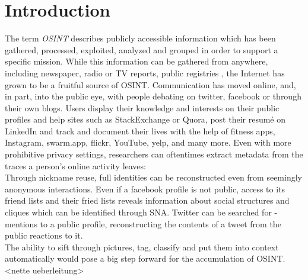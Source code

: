 \documentclass[twoside,a4paper]{article}
\title{\papertitle}
\affiliation{
\paperauthorA}
{\href{http://www.haw-hamburg.de/ti-i}{Hamburg University of Applied Sciences,
    Dept. Computer Science,} \\ Berliner Tor 7\\ 20099 Hamburg, Germany\\
{\ttfamily \href{mailto:lotte.steenbrink@haw-hamburg.de}{lotte.steenbrink@haw-hamburg.de}}
}
\newif\ifpdf
\begin{document}
\ifpdf %
  \DeclareGraphicsExtensions{.png,.jpg,.pdf}
\else  %
\fi

\maketitle

\begin{abstract}
Recognizing an categorizing objects in an image is one of the problems which are harder to solve for computers than for humans. However, image recognition is imperative to make human-computer interaction more natural and improve the way information contained in images is stored and handled. In recent years, the field has seen a lot of progress. This paper aims to provide an overview over the challenges faced by image recognition software, and available solutions as well as their limitations.
\end{abstract}


\section{Introduction}
\label{sec:intro}



The term \emph{\gls{OSINT}} describes publicly accessible information which has been gathered, processed, exploited, analyzed and grouped in order to support a specific mission.
While this information can be gathered from anywhere, including newspaper, radio or TV reports, public registries , the Internet has grown to be a fruitful source of OSINT. Communication has moved online, and, in part, into the public eye, with people debating on twitter, facebook or through their own blogs. Users display their knowledge and interests on their public profiles and help sites such as StackExchange or Quora, post their resumé on LinkedIn and track and document their lives with the help of fitness apps, Instagram, swarm.app, flickr, YouTube, yelp, and many more. Even with more prohibitive privacy settings, researchers can oftentimes extract metadata from the traces a person's online activity leaves:\\
Through nickname reuse, full identities can be reconstructed even from seemingly anonymous interactions. Even if a facebook profile is not public, access to its friend lists and their fried lists reveals information about social structures and cliques which can be identified through \gls{SNA}. Twitter can be searched for \@-mentions to a public profile, reconstructing the contents of a tweet from the public reactions to it.\\ 
The ability to sift through pictures, tag, classify and put them into context automatically would pose a big step forward for the accumulation of OSINT.
<nette ueberleitung>
\end{document}
